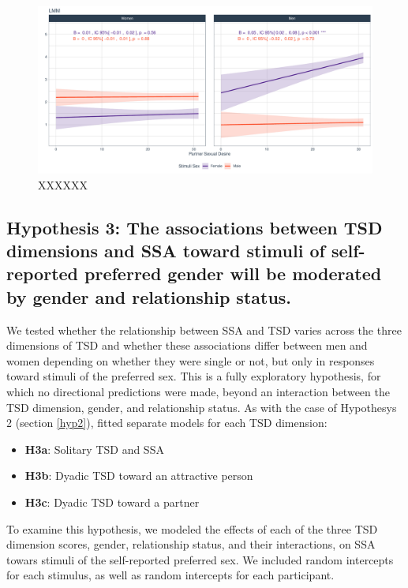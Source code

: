 \documentclass[
  bookmarksnumbered]{article}
\providecommand{\tightlist}{%
  \setlength{\itemsep}{0pt}\setlength{\parskip}{0pt}}
\begin{document}
\begin{figure}
\centering
\includegraphics{Sexual_Desire_Arousal_V2_files/figure-latex/fig-h2c-1.pdf}
\caption{\label{fig:fig-h2c}XXXXXX}
\end{figure}

\subsection{Hypothesis 3: The associations between TSD dimensions and SSA toward stimuli of self-reported preferred gender will be moderated by gender and relationship status.}\label{hyp3}

We tested whether the relationship between SSA and TSD varies across the three dimensions of TSD and whether these associations differ between men and women depending on whether they were single or not, but only in responses toward stimuli of the preferred sex. This is a fully exploratory hypothesis, for which no directional predictions were made, beyond an interaction between the TSD dimension, gender, and relationship status. As with the case of Hypothesys 2 (section \ref{hyp2}), fitted separate models for each TSD dimension:

\begin{itemize}
\tightlist
\item
  \textbf{H3a}: Solitary TSD and SSA
\item
  \textbf{H3b}: Dyadic TSD toward an attractive person
\item
  \textbf{H3c}: Dyadic TSD toward a partner
\end{itemize}

To examine this hypothesis, we modeled the effects of each of the three TSD dimension scores, gender, relationship status, and their interactions, on SSA towars stimuli of the self-reported preferred sex. We included random intercepts for each stimulus, as well as random intercepts for each participant.
\end{document}
